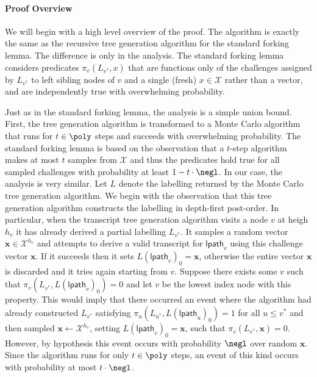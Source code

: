 \documentclass{article}
\theoremstyle{definition}
\begin{document}
 \paragraph{Proof Overview} 
 We will begin with a high level overview of the proof. The algorithm is exactly the same as the recursive tree generation algorithm for the standard forking lemma. The difference is only in the analysis. The standard forking lemma considers predicates $\pi_v(L_{v^*}, x)$ that are functions only of the challenges assigned by $L_{v^*}$ to left sibling nodes of $v$ and a single (fresh) $x \in \mathcal{X}$ rather than a vector, and are independently true with overwhelming probability. %

Just as in the standard forking lemma, the analysis is a simple union bound. First, the tree generation algorithm is transformed to a Monte Carlo algorithm that runs for $t \in \poly$ steps and succeeds with overwhelming probability. The standard forking lemma is based on the observation that a $t$-step algorithm makes at most $t$ samples from $\mathcal{X}$ and thus the predicates hold true for all sampled challenges with probability at least $1 - t\cdot \negl$. In our case, the analysis is very similar. Let $L$ denote the labelling returned by the Monte Carlo tree generation algorithm. We begin with the observation that this tree generation algorithm constructs the labelling in depth-first post-order. In particular, when the transcript tree generation algorithm visits a node $v$ at heigh $h_v$ it has already derived a partial labelling $L_{v^*}$. It samples a random vector $\mathbf{x} \in \mathcal{X}^{h_v}$ and attempts to derive a valid transcript for $\mathsf{lpath}_v$ using this challenge vector $\mathbf{x}$. If it succeeds then it sets $L(\mathsf{lpath}_v)_0 = \mathbf{x}$, otherwise the entire vector $\mathbf{x}$ is discarded and it tries again starting from $v$. Suppose there exists some $v$ such that $\pi_v(L_{v^*}, L(\mathsf{lpath}_v)_0) = 0$ and let $v$ be the lowest index node with this property.  This would imply that there occurred an event where the algorithm had already constructed $L_{v^*}$ satisfying $\pi_u(L_{u^*}, L(\mathsf{lpath}_u)_0) = 1$ for all $u \leq v^*$ and then sampled $\mathbf{x} \leftarrow \mathcal{X}^{h_v}$, setting $L(\mathsf{lpath}_v)_0 = \mathbf{x}$, such that $\pi_v(L_{v^*}, \mathbf{x}) = 0$. However, by hypothesis this event occurs with probability $\negl$ over random $\mathbf{x}$. Since the algorithm runs for only $t \in \poly$ steps, an event of this kind occurs with probability at most $t \cdot \negl$. 
\end{document}
